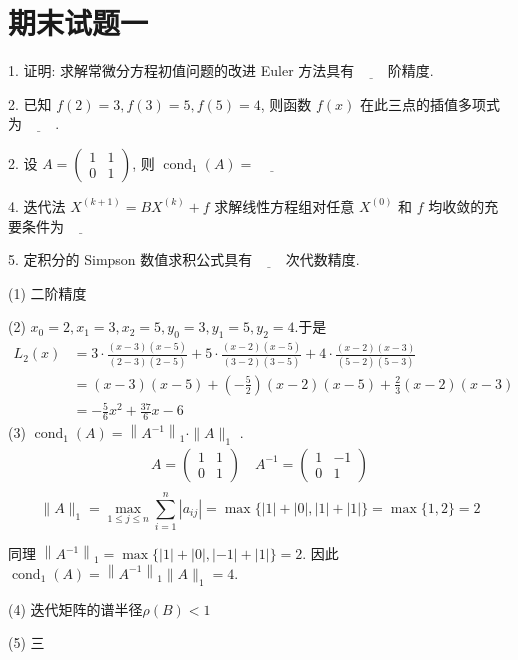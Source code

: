 \newpage
\section{期末试题一}
\begin{tcolorbox}[breakable,
		colframe=white!10!jingga, coltitle=white!90!jingga, colback=white!95!jingga, coltext=black, colbacktitle=white!10!jingga, enhanced, fonttitle=\bfseries,fontupper=\normalsize, attach boxed title to top left={yshift=-2mm}, before skip=8pt, after skip=8pt,
		title=填空题]
 

1. 证明: 求解常微分方程初值问题的改进 Euler 方法具有$\underline{\hspace{1cm}}$阶精度.
    
2. 已知 $ f(2)=3, f(3)=5, f(5)=4 $, 则函数 $ f(x) $ 在此三点的插值多项式为$\underline{\hspace{1cm}}$.

2. 设 $ A=\left(\begin{array}{ll}1 & 1 \\ 0 & 1\end{array}\right) $, 则 $ \operatorname{cond}_{1}(A)= \underline{\hspace{1cm}}$

4. 迭代法 $ X^{(k+1)}=B X^{(k)}+f $ 求解线性方程组对任意 $ X^{(0)} $ 和 $ f $ 均收敛的充要条件为$\underline{\hspace{1cm}}$

5. 定积分的 Simpson 数值求积公式具有$\underline{\hspace{1cm}}$次代数精度.

 \tcblower

(1) 二阶精度

(2) $x_{0}  =2, x_{1}=3, x_{2}=5 , y_{0}  =3, y_{1}=5, y_{2}=4 $.于是
$$
\begin{aligned}
L_{2}(x) & =3 \cdot \frac{(x-3)(x-5)}{(2-3)(2-5)}+5 \cdot \frac{(x-2)(x-5)}{(3-2)(3-5)}+4 \cdot \frac{(x-2)(x-3)}{(5-2)(5-3)} \\
& =(x-3)(x-5)+(-\frac{5}{2})(x-2)(x-5)+\frac{2}{3}(x-2)(x-3) \\
& =-\frac{5}{6} x^{2}+\frac{37}{6} x-6
\end{aligned}
$$
(3) $\operatorname{cond}_1(A)=\left\|A^{-1}\right\|_{1} \cdot\|A\|_{1}$ .
$$
\begin{array}{l}
A=\left(\begin{array}{ll}
1 & 1 \\
0 & 1
\end{array}\right) \quad A^{-1}=\left(\begin{array}{cc}
1 & -1 \\
0 & 1
\end{array}\right) \\
\end{array}
$$
$$\|A\|_{1}=\max _{1 \leqslant j \leqslant n} \sum_{i=1}^{n}\left|a_{i j}\right|=\max \{|1|+|0|,|1|+|1|\} 
=\max \{1,2\}=2 $$

同理 $ \left\|A^{-1}\right\|_{1}=\max \{|1|+|0|,|-1|+|1|\}=2 $.
因此 $ \operatorname{cond}_{1}(A)=\left\|A^{-1}\right\|_{1}\|A\|_{1}=4 $.

(4) 迭代矩阵的谱半径$\rho(B)<1$

(5) 三
\end{tcolorbox}

